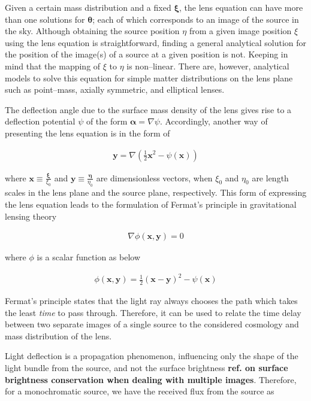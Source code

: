 \documentclass[paper=a4, fontsize=11pt]{scrartcl} %
\numberwithin{equation}{section} %
\numberwithin{figure}{section} %
\numberwithin{table}{section} %
\begin{document}
Given a certain mass distribution and a fixed $\boldsymbol \xi$, the lens equation can have more than one solutions for $\boldsymbol \theta$; each of which corresponds to an image of the source in the sky.  Although obtaining the source position $\eta$ from a given image position $\xi$ using the lens equation is straightforward, finding a general analytical solution for the position of the image(s) of a source at a given position is not. Keeping in mind that the mapping of $\xi$ to $\eta$ is non--linear. There are, however, analytical models to solve this equation for simple matter distributions on the lens plane such as point--mass, axially symmetric, and elliptical lenses.

The deflection angle due to the surface mass density of the lens gives rise to a deflection potential $\psi$ of the form $\boldsymbol \alpha = \nabla \psi$. Accordingly, another way of presenting the lens equation is in the form of 

\begin{eqnarray}
\label{eq:potential_dimensionless_lensing}
\textbf{y} = \nabla \left(\frac{1}{2}\textbf{x}^2 - \psi(\textbf{x}) \right)
\end{eqnarray}

where $\textbf{x} \equiv \frac{\boldsymbol \xi}{\xi_0}$ and $\textbf{y} \equiv \frac{\boldsymbol \eta}{\eta_0}$ are dimensionless vectors, when $\xi_0$ and $\eta_0$ are length scales in the lens plane and the source plane, respectively. This form of expressing the lens equation leads to the formulation of Fermat's principle in gravitational lensing theory

\begin{eqnarray}
\nabla \phi(\textbf{x}, \textbf{y}) = 0
\end{eqnarray}

where $\phi$ is a scalar function as below

\begin{eqnarray}
\phi(\textbf{x}, \textbf{y}) = \frac{1}{2} (\textbf{x} - \textbf{y})^2 - \psi(\textbf{x})
\end{eqnarray}

Fermat's principle states that the light ray always chooses the path which takes the least \emph{time} to pass through. Therefore, it can be used to relate the time delay between two separate images of a single source to the considered cosmology and mass distribution of the lens.


Light deflection is a propagation phenomenon, influencing only the shape of the light bundle from the source, and not the surface brightness {\bf ref. on surface brightness conservation when dealing with multiple images}. Therefore, for a monochromatic source, we have the received flux from the source as 
\end{document}
